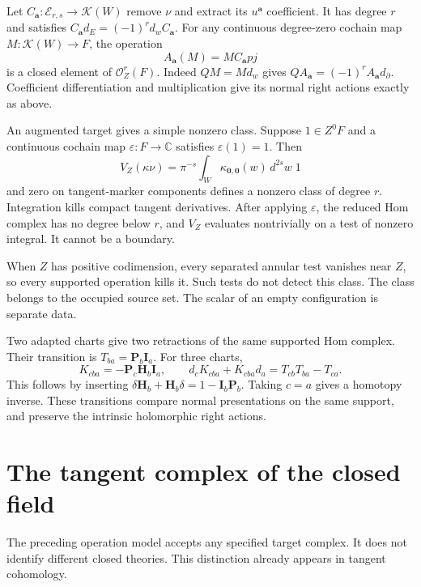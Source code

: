 Let $C_{\mathbf a}:\mathcal E_{r,s}\to\mathcal K(W)$ remove
$\nu$ and extract its $u^{\mathbf a}$ coefficient.
It has degree $r$ and satisfies
$C_{\mathbf a}d_E=(-1)^r d_w C_{\mathbf a}$.
For any continuous degree-zero cochain map
$M:\mathcal K(W)\to F$, the operation
\begin{equation}\label{mht:eq:supported-current-lift}
 A_{\mathbf a}(M)=MC_{\mathbf a}pj
\end{equation}
is a closed element of $\mathcal O_Z^r(F)$.
Indeed $QM=Md_w$ gives
$QA_{\mathbf a}=(-1)^rA_{\mathbf a}d_\partial$.
Coefficient differentiation and multiplication give its
normal right actions exactly as above.

An augmented target gives a simple nonzero class. Suppose
$1\in Z^0F$ and a continuous cochain map
$\varepsilon:F\to\mathbb C$ satisfies $\varepsilon(1)=1$.
Then
\[
 V_Z(\kappa\nu)=\pi^{-s}\int_W
                    \kappa_{\mathbf0,\mathbf0}(w)\,d^{2s}w\;1
\]
and zero on tangent-marker components defines a nonzero
class of degree $r$. Integration kills compact tangent
derivatives. After applying $\varepsilon$, the reduced
Hom complex has no degree below $r$, and $V_Z$ evaluates
nontrivially on a test of nonzero integral. It cannot be
a boundary.

When $Z$ has positive codimension, every separated annular
test vanishes near $Z$, so every supported operation kills
it. Such tests do not detect this class. The class belongs
to the occupied source set. The scalar of an empty
configuration is separate data.

Two adapted charts give two retractions of the same
supported Hom complex. Their transition is
$T_{ba}=\mathbf P_b\mathbf I_a$.
For three charts,
\[
 K_{cba}=-\mathbf P_c\mathbf H_b\mathbf I_a,
 \qquad
 d_cK_{cba}+K_{cba}d_a=T_{cb}T_{ba}-T_{ca}.
\]
This follows by inserting
$\delta\mathbf H_b+\mathbf H_b\delta=1-\mathbf I_b\mathbf P_b$.
Taking $c=a$ gives a homotopy inverse. These transitions
compare normal presentations on the same support, and
preserve the intrinsic holomorphic right actions.

\section{The tangent complex of the closed field}

The preceding operation model accepts any specified target
complex. It does not identify different closed theories.
This distinction already appears in tangent cohomology.

